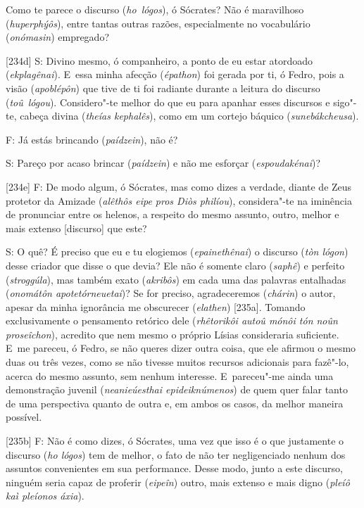  

Como te parece o discurso (\emph{ho}~\emph{lógos}), ó Sócrates? Não é
maravilhoso (\emph{huperphýôs}), entre tantas outras razões,
especialmente no vocabulário (\emph{onómasin}) empregado?

 

[234d] S: Divino mesmo, ó companheiro, a ponto de eu estar atordoado
(\emph{ekplagênai}). E~essa minha afecção (\emph{épathon}) foi gerada
por ti, ó Fedro, pois a visão (\emph{apoblépôn}) que tive de ti foi
radiante durante a leitura do discurso (\emph{toû}~\emph{lógou}).
Considero"-te melhor do que eu para apanhar esses discursos e sigo"-te,
cabeça divina (\emph{theías kephalês}), como em um cortejo báquico
(\emph{sunebákcheusa}).

 

F: Já estás brincando (\emph{paídzein}), não é?

 

S: Pareço por acaso brincar (\emph{paídzein}) e não me esforçar
(\emph{espoudakénai})?

 

[234e] F: De modo algum, ó Sócrates, mas como dizes a verdade,
diante de Zeus protetor da Amizade (\emph{alêthôs eipe pros Diòs
philíou}), considera"-te na iminência de pronunciar entre os helenos, a
respeito do mesmo assunto, outro, melhor e mais extenso [discurso]
que este?

 

S: O quê? É preciso que eu e tu elogiemos (\emph{epainethênai}) o
discurso (\emph{tòn lógon}) desse criador que disse o que devia? Ele não
é somente claro (\emph{saphê}) e perfeito (\emph{stroggúla}), mas também
exato (\emph{akribôs}) em cada uma das palavras entalhadas
(\emph{onomátôn apotetórneuetai})? Se for preciso, agradeceremos
(\emph{chárin}) o autor, apesar da minha ignorância me obscurecer
(\emph{elathen}) [235a]. Tomando exclusivamente o pensamento
retórico dele (\emph{rhêtorikôi autoû mónôi tón noûn proseîchon}),
acredito que nem mesmo o próprio Lísias consideraria suficiente. E~me
pareceu, ó Fedro, se não queres dizer outra coisa, que ele afirmou o
mesmo duas ou três vezes, como se não tivesse muitos recursos adicionais
para fazê"-lo, acerca do mesmo assunto, sem nenhum interesse. E~pareceu"-me ainda uma demonstração juvenil (\emph{neanieúesthai
epideiknúmenos}) de quem quer falar tanto de uma perspectiva quanto de
outra e, em ambos os casos, da melhor maneira possível.

 

[235b] F: Não é como dizes, ó Sócrates, uma vez que isso é o que
justamente o discurso (\emph{ho lógos}) tem de melhor, o fato de não ter
negligenciado nenhum dos assuntos convenientes em sua performance. Desse
modo, junto a este discurso, ninguém seria capaz de proferir
(\emph{eipeîn}) outro, mais extenso e mais digno (\emph{pleíô kaì
pleíonos áxia}).

